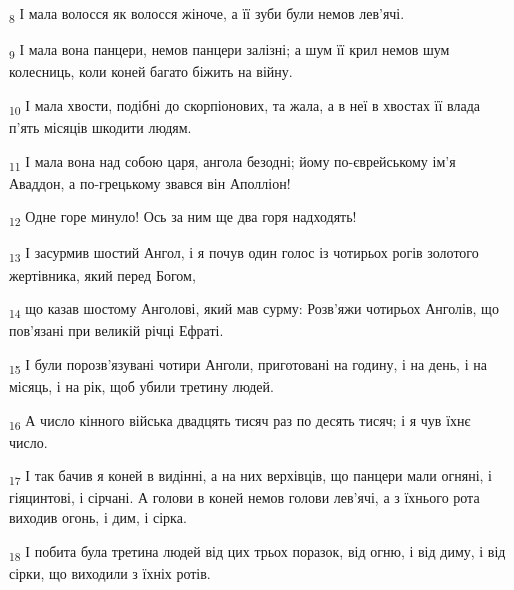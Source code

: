 \begin{tcolorbox}
\textsubscript{8} І мала волосся як волосся жіноче, а її зуби були немов лев'ячі.
\end{tcolorbox}
\begin{tcolorbox}
\textsubscript{9} І мала вона панцери, немов панцери залізні; а шум її крил немов шум колесниць, коли коней багато біжить на війну.
\end{tcolorbox}
\begin{tcolorbox}
\textsubscript{10} І мала хвости, подібні до скорпіонових, та жала, а в неї в хвостах її влада п'ять місяців шкодити людям.
\end{tcolorbox}
\begin{tcolorbox}
\textsubscript{11} І мала вона над собою царя, ангола безодні; йому по-єврейському ім'я Аваддон, а по-грецькому звався він Аполліон!
\end{tcolorbox}
\begin{tcolorbox}
\textsubscript{12} Одне горе минуло! Ось за ним ще два горя надходять!
\end{tcolorbox}
\begin{tcolorbox}
\textsubscript{13} І засурмив шостий Ангол, і я почув один голос із чотирьох рогів золотого жертівника, який перед Богом,
\end{tcolorbox}
\begin{tcolorbox}
\textsubscript{14} що казав шостому Анголові, який мав сурму: Розв'яжи чотирьох Анголів, що пов'язані при великій річці Ефраті.
\end{tcolorbox}
\begin{tcolorbox}
\textsubscript{15} І були порозв'язувані чотири Анголи, приготовані на годину, і на день, і на місяць, і на рік, щоб убили третину людей.
\end{tcolorbox}
\begin{tcolorbox}
\textsubscript{16} А число кінного війська двадцять тисяч раз по десять тисяч; і я чув їхнє число.
\end{tcolorbox}
\begin{tcolorbox}
\textsubscript{17} І так бачив я коней в видінні, а на них верхівців, що панцери мали огняні, і гіяцинтові, і сірчані. А голови в коней немов голови лев'ячі, а з їхнього рота виходив огонь, і дим, і сірка.
\end{tcolorbox}
\begin{tcolorbox}
\textsubscript{18} І побита була третина людей від цих трьох поразок, від огню, і від диму, і від сірки, що виходили з їхніх ротів.
\end{tcolorbox}
